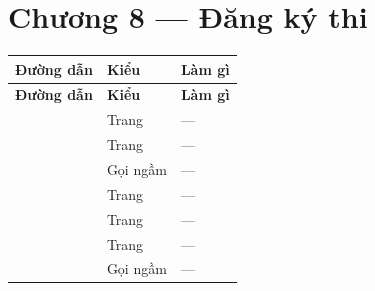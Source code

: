 \section{Chương 8 --- Đăng ký thi}
\footnotesize
\begin{longtable}{L{7.0cm}L{1.8cm}L{6.0cm}}
\textbf{Đường dẫn} & \textbf{Kiểu} & \textbf{Làm gì}\\ \midrule
\endfirsthead
{}\textbf{Đường dẫn} & \textbf{Kiểu} & \textbf{Làm gì}\\ \midrule
\endhead
{} & Trang & ---\\
 & Trang & ---\\
 & Gọi ngầm & ---\\
 & Trang & ---\\
 & Trang & ---\\
 & Trang & ---\\
 & Gọi ngầm & ---\\
\end{longtable}
\normalsize

